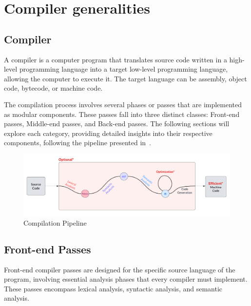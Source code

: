 \section{Compiler generalities}\label{sec:aco:general}

    \subsection{Compiler}

        A compiler is a computer program that translates source code written in a high-level programming language into a target low-level programming language, allowing the computer to execute it. The target language can be assembly, object code, bytecode, or machine code.

        The compilation process involves several phases or passes that are implemented as modular components. These passes fall into three distinct classes: Front-end passes, Middle-end passes, and Back-end passes. The following sections will explore each category, providing detailed insights into their respective components, following the pipeline presented in~.

        \begin{figure}[hbt!]
                \begin{center}
                \includegraphics[width=.9\textwidth]{assets/images/compil.png}
                \end{center}
                \caption{Compilation Pipeline}%
                \label{fig:aco:general:compil}
            \end{figure}

    

    \subsection{Front-end Passes}
        Front-end compiler passes are designed for the specific source language of the program, involving essential analysis phases that every compiler must implement. These passes encompass lexical analysis, syntactic analysis, and semantic analysis. 

